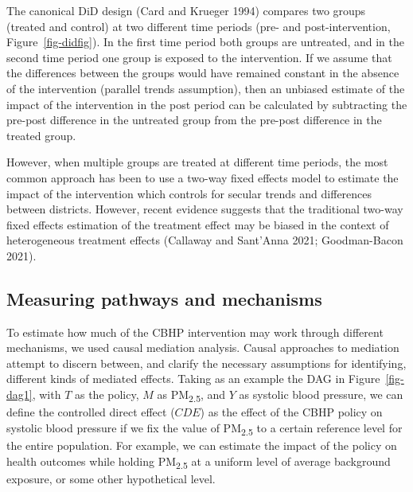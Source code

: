 \documentclass[
  letterpaper,
  DIV=11,
  numbers=noendperiod]{scrartcl}
\begin{document}
The canonical DiD design (Card and Krueger 1994) compares two groups
(treated and control) at two different time periods (pre- and
post-intervention, Figure~\ref{fig-didfig}). In the first time period
both groups are untreated, and in the second time period one group is
exposed to the intervention. If we assume that the differences between
the groups would have remained constant in the absence of the
intervention (parallel trends assumption), then an unbiased estimate of
the impact of the intervention in the post period can be calculated by
subtracting the pre-post difference in the untreated group from the
pre-post difference in the treated group.

However, when multiple groups are treated at different time periods, the
most common approach has been to use a two-way fixed effects model to
estimate the impact of the intervention which controls for secular
trends and differences between districts. However, recent evidence
suggests that the traditional two-way fixed effects estimation of the
treatment effect may be biased in the context of heterogeneous treatment
effects (Callaway and Sant'Anna 2021; Goodman-Bacon 2021).

\hypertarget{measuring-pathways-and-mechanisms}{%
\subsection{Measuring pathways and
mechanisms}\label{measuring-pathways-and-mechanisms}}

To estimate how much of the CBHP intervention may work through different
mechanisms, we used causal mediation analysis. Causal approaches to
mediation attempt to discern between, and clarify the necessary
assumptions for identifying, different kinds of mediated effects. Taking
as an example the DAG in Figure~\ref{fig-dag1}, with \(T\) as the
policy, \(M\) as PM\textsubscript{2.5}, and \(Y\) as systolic blood
pressure, we can define the controlled direct effect (\(CDE\)) as the
effect of the CBHP policy on systolic blood pressure if we fix the value
of PM\textsubscript{2.5} to a certain reference level for the entire
population. For example, we can estimate the impact of the policy on
health outcomes while holding PM\textsubscript{2.5} at a uniform level
of average background exposure, or some other hypothetical level.
\end{document}

